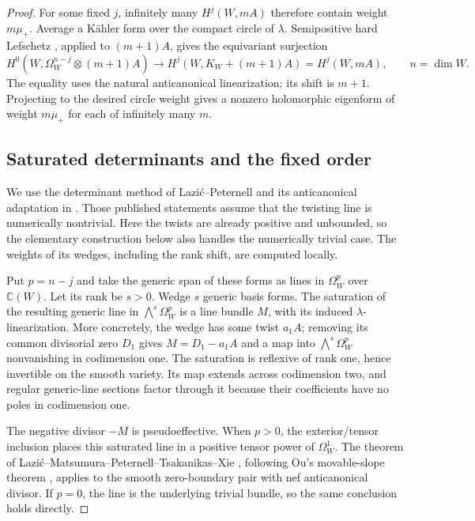 \begin{proof}
For some fixed $j$, infinitely many $H^j(W,mA)$ therefore contain
weight $m\mu_+$.  Average a K\"ahler form over the compact circle of
$\lambda$.  Semipositive hard Lefschetz
\cite{DPS2001}, applied to $(m+1)A$, gives the equivariant surjection
\[
 H^0(W,\Omega_W^{n-j}\otimes(m+1)A)
 \longrightarrow H^j(W,K_W+(m+1)A)=H^j(W,mA),
 \qquad n=\dim W.
\]
The equality uses the natural anticanonical linearization; its shift
is $m+1$.  Projecting to the desired circle weight gives a nonzero
holomorphic eigenform of weight $m\mu_+$ for each of infinitely
many $m$.

\subsection*{Saturated determinants and the fixed order}

We use the determinant method of Lazi\'c--Peternell
\cite[Lemma~4.1]{LP2018} and its anticanonical adaptation in
\cite[Lemma~5.1]{LMPTX2023}.  Those published statements assume
that the twisting line is numerically nontrivial.  Here the twists
are already positive and unbounded, so the elementary construction
below also handles the numerically trivial case.  The weights of
its wedges, including the rank shift, are computed locally.

Put $p=n-j$ and take the generic span of these forms as lines in
$\Omega_W^p$ over $\mathbb C(W)$.  Let its rank be $s>0$.  Wedge
$s$ generic basis forms.  The saturation of the resulting generic
line in $\bigwedge^s\Omega_W^p$ is a line bundle $M$, with its induced
$\lambda$-linearization.  More concretely, the wedge has some twist
$a_1A$; removing its common divisorial zero $D_1$ gives
$M=D_1-a_1A$ and a map into $\bigwedge^s\Omega_W^p$ nonvanishing in
codimension one.  The saturation is reflexive of rank one, hence
invertible on the smooth variety.  Its map extends across codimension
two, and regular generic-line sections factor through it because
their coefficients have no poles in codimension one.

The negative divisor $-M$ is pseudoeffective.  When $p>0$, the
exterior/tensor inclusion places this saturated line in a positive
tensor power of $\Omega_W^1$.  The theorem of
Lazi\'c--Matsumura--Peternell--Tsakanikas--Xie
\cite[Theorem~4.1]{LMPTX2023}, following Ou's movable-slope theorem
\cite[Theorem~1.4]{Ou2023}, applies to the smooth zero-boundary pair
with nef anticanonical divisor.  If $p=0$, the line is the underlying
trivial bundle, so the same conclusion holds directly.


\end{proof}
